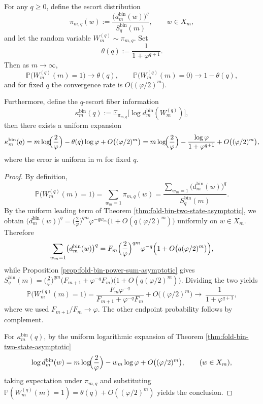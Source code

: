 \begin{proposition}\label{prop:fold-bin-escort-lastbit}
For any \(q\ge 0\), define the escort distribution
\[
\pi_{m,q}(w):=\frac{\bigl(d^{\mathrm{bin}}_m(w)\bigr)^q}{S_q^{\mathrm{bin}}(m)},\qquad w\in X_m,
\]
and let the random variable \(W^{(q)}_m\sim\pi_{m,q}\).
Set
\[
\theta(q):=\frac{1}{1+\varphi^{q+1}}.
\]
Then as \(m\to\infty\),
\[
\mathbb{P}\bigl(W^{(q)}_m(m)=1\bigr)\to \theta(q),
\qquad
\mathbb{P}\bigl(W^{(q)}_m(m)=0\bigr)\to 1-\theta(q),
\]
and for fixed \(q\) the convergence rate is \(O\bigl((\varphi/2)^m\bigr)\).

Furthermore, define the \(q\)-escort fiber information
\[
\kappa^{\mathrm{bin}}_m(q):=\mathbb{E}_{\pi_{m,q}}\bigl[\log d^{\mathrm{bin}}_m(W^{(q)}_m)\bigr],
\]
then there exists a uniform expansion
\[
\kappa^{\mathrm{bin}}_m(q)=m\log\!\Bigl(\frac{2}{\varphi}\Bigr)-\theta(q)\log\varphi+O\bigl((\varphi/2)^m\bigr)
=m\log\!\Bigl(\frac{2}{\varphi}\Bigr)-\frac{\log\varphi}{1+\varphi^{q+1}}+O\bigl((\varphi/2)^m\bigr),
\]
where the error is uniform in \(m\) for fixed \(q\).
\end{proposition}

\begin{proof}
By definition,
\[
\mathbb{P}\bigl(W^{(q)}_m(m)=1\bigr)
=\sum_{w_m=1}\pi_{m,q}(w)
=\frac{\sum_{w_m=1}\bigl(d^{\mathrm{bin}}_m(w)\bigr)^q}{S_q^{\mathrm{bin}}(m)}.
\]
By the uniform leading term of Theorem \ref{thm:fold-bin-two-state-asymptotic}, we obtain
\(
\bigl(d^{\mathrm{bin}}_m(w)\bigr)^q=\bigl(\frac{2}{\varphi}\bigr)^{qm}\varphi^{-qw_m}\bigl(1+O(q(\varphi/2)^m)\bigr)
\)
uniformly on \(w\in X_m\).
Therefore
\[
\sum_{w_m=1}\bigl(d^{\mathrm{bin}}_m(w)\bigr)^q
=F_m\Bigl(\frac{2}{\varphi}\Bigr)^{qm}\varphi^{-q}\Bigl(1+O\bigl(q(\varphi/2)^m\bigr)\Bigr),
\]
while Proposition \ref{prop:fold-bin-power-sum-asymptotic} gives
\(
S_q^{\mathrm{bin}}(m)=\bigl(\frac{2}{\varphi}\bigr)^{qm}\bigl(F_{m+1}+\varphi^{-q}F_m\bigr)\bigl(1+O(q(\varphi/2)^m)\bigr)
\).
Dividing the two yields
\[
\mathbb{P}\bigl(W^{(q)}_m(m)=1\bigr)
=\frac{F_m\varphi^{-q}}{F_{m+1}+\varphi^{-q}F_m}+O\bigl((\varphi/2)^m\bigr)
\longrightarrow\ \frac{1}{1+\varphi^{q+1}},
\]
where we used \(F_{m+1}/F_m\to\varphi\).
The other endpoint probability follows by complement.

For \(\kappa^{\mathrm{bin}}_m(q)\), by the uniform logarithmic expansion of Theorem \ref{thm:fold-bin-two-state-asymptotic}
\[
\log d^{\mathrm{bin}}_m(w)
=m\log\!\Bigl(\frac{2}{\varphi}\Bigr)-w_m\log\varphi+O\bigl((\varphi/2)^m\bigr),
\qquad (w\in X_m),
\]
taking expectation under \(\pi_{m,q}\) and substituting \(\mathbb{P}(W^{(q)}_m(m)=1)=\theta(q)+O((\varphi/2)^m)\) yields the conclusion.
\end{proof}


